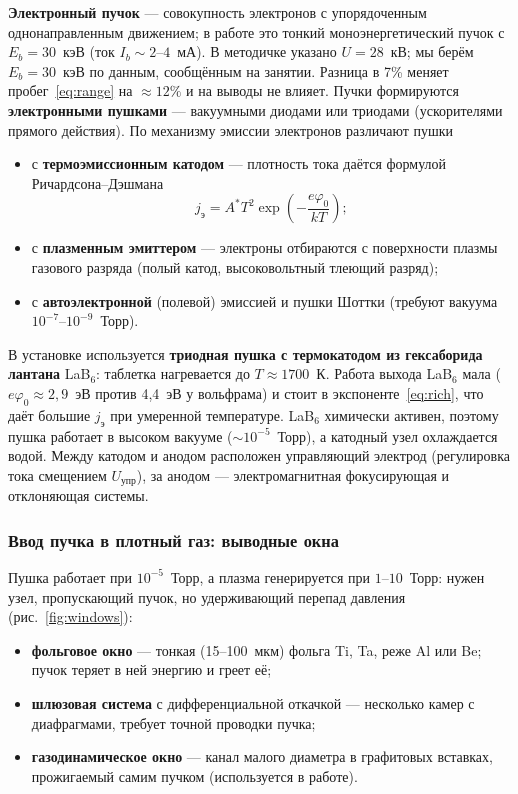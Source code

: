 \documentclass[12pt,a4paper]{article}
\begin{document}
\textbf{Электронный пучок} --- совокупность электронов с упорядоченным
однонаправленным движением; в работе это тонкий моноэнергетический
пучок с $E_b = 30$~кэВ (ток $I_b \sim 2$--$4$~мА). В методичке указано
$U = 28$~кВ; мы берём $E_b = 30$~кэВ по данным, сообщённым на занятии.
Разница в 7\% меняет пробег~\eqref{eq:range} на $\approx 12\%$ и на выводы
не влияет. Пучки формируются \textbf{электронными пушками}
--- вакуумными диодами или триодами (ускорителями прямого действия).
По механизму эмиссии электронов различают пушки
\begin{itemize}
  \item с \textbf{термоэмиссионным катодом} --- плотность тока даётся
        формулой Ричардсона--Дэшмана
        \begin{equation}
            j_\text{э} = A^* T^2 \exp\!\left(-\frac{e\varphi_0}{kT}\right);
            \label{eq:rich}
        \end{equation}
  \item с \textbf{плазменным эмиттером} --- электроны отбираются с
        поверхности плазмы газового разряда (полый катод, высоковольтный
        тлеющий разряд);
  \item с \textbf{автоэлектронной} (полевой) эмиссией и пушки Шоттки
        (требуют вакуума $10^{-7}$--$10^{-9}$~Торр).
\end{itemize}

В установке используется \textbf{триодная пушка с термокатодом из
гексаборида лантана} LaB$_6$: таблетка нагревается до $T \approx 1700$~К.
Работа выхода LaB$_6$ мала ($e\varphi_0 \approx 2{,}9$~эВ против
4,4~эВ у вольфрама) и стоит в экспоненте~\eqref{eq:rich}, что даёт большие
$j_\text{э}$ при умеренной температуре. LaB$_6$ химически активен,
поэтому пушка работает в высоком вакууме ($\sim 10^{-5}$~Торр), а катодный
узел охлаждается водой. Между катодом и анодом расположен управляющий
электрод (регулировка тока смещением $U_\text{упр}$), за анодом ---
электромагнитная фокусирующая и отклоняющая системы.

\subsubsection{Ввод пучка в плотный газ: выводные окна}\label{sec:windows}

Пушка работает при $10^{-5}$~Торр, а плазма генерируется при
$1$--$10$~Торр: нужен узел, пропускающий пучок, но удерживающий перепад
давления (рис.~\ref{fig:windows}):
\begin{itemize}
  \item \textbf{фольговое окно} --- тонкая (15--100~мкм) фольга Ti, Ta,
        реже Al или Be; пучок теряет в ней энергию и греет её;
  \item \textbf{шлюзовая система} с дифференциальной откачкой ---
        несколько камер с диафрагмами, требует точной проводки пучка;
  \item \textbf{газодинамическое окно} --- канал малого диаметра в
        графитовых вставках, прожигаемый самим пучком (используется в
        работе).
\end{itemize}
\end{document}
